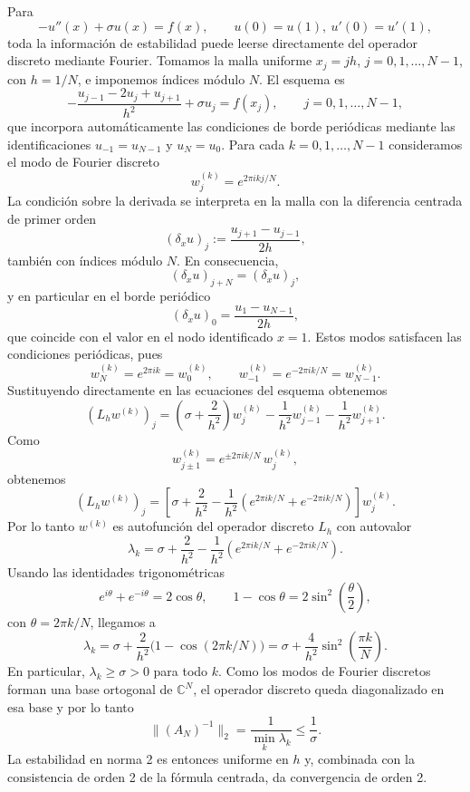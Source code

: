 \documentclass[a4paper,11pt]{report}
\begin{document}
Para
\[
-u''(x)+\sigma u(x)=f(x),\qquad u(0)=u(1),\ u'(0)=u'(1),
\]
toda la información de estabilidad puede leerse directamente del operador discreto mediante Fourier. Tomamos la malla uniforme $x_j=jh$, $j=0,1,\dots,N-1$, con $h=1/N$, e imponemos índices módulo $N$. El esquema es
\[
  -\frac{u_{j-1}-2u_j+u_{j+1}}{h^2}+\sigma u_j=f(x_j),
  \qquad j=0,1,\dots,N-1,
\]
que incorpora automáticamente las condiciones de borde periódicas mediante las identificaciones $u_{-1}=u_{N-1}$ y $u_N=u_0$. Para cada $k=0,1,\dots,N-1$ consideramos el modo de Fourier discreto
\[
  w_j^{(k)}=e^{2\pi i kj/N}.
\]
La condición sobre la derivada se interpreta en la malla con la diferencia centrada de primer orden
\[
  (\delta_x u)_j:=\frac{u_{j+1}-u_{j-1}}{2h},
\]
también con índices módulo $N$. En consecuencia,
\[
  (\delta_x u)_{j+N}=(\delta_x u)_j,
\]
y en particular en el borde periódico
\[
  (\delta_x u)_0=\frac{u_1-u_{N-1}}{2h},
\]
que coincide con el valor en el nodo identificado $x=1$.
Estos modos satisfacen las condiciones periódicas, pues
\[
  w_N^{(k)}=e^{2\pi i k}=w_0^{(k)},
  \qquad
  w_{-1}^{(k)}=e^{-2\pi i k/N}=w_{N-1}^{(k)}.
\]
Sustituyendo directamente en las ecuaciones del esquema obtenemos
\[
  (L_h w^{(k)})_j
  =\left(\sigma+\frac{2}{h^2}\right)w_j^{(k)}
   -\frac{1}{h^2}w_{j-1}^{(k)}
   -\frac{1}{h^2}w_{j+1}^{(k)}.
\]
Como
\[
  w_{j\pm1}^{(k)}=e^{\pm 2\pi i k/N}\,w_j^{(k)},
\]
obtenemos
\[
  (L_h w^{(k)})_j
  =\left[\sigma+\frac{2}{h^2}-\frac{1}{h^2}\left(e^{2\pi i k/N}+e^{-2\pi i k/N}\right)\right]w_j^{(k)}.
\]
Por lo tanto $w^{(k)}$ es autofunción del operador discreto $L_h$ con autovalor
\[
  \lambda_k=\sigma+\frac{2}{h^2}-\frac{1}{h^2}\left(e^{2\pi i k/N}+e^{-2\pi i k/N}\right).
\]
Usando las identidades trigonométricas
\[
  e^{i\theta}+e^{-i\theta}=2\cos\theta,
  \qquad
  1-\cos\theta=2\sin^2\!\left(\frac{\theta}{2}\right),
\]
con $\theta=2\pi k/N$, llegamos a
\[
  \lambda_k
  =\sigma+\frac{2}{h^2}\bigl(1-\cos(2\pi k/N)\bigr)
  =\sigma+\frac{4}{h^2}\sin^2\!\left(\frac{\pi k}{N}\right).
\]
En particular, $\lambda_k\ge\sigma>0$ para todo $k$. Como los modos de Fourier discretos forman una base ortogonal de $\mathbb C^N$, el operador discreto queda diagonalizado en esa base y por lo tanto
\[
  \|(A_N)^{-1}\|_2=\frac{1}{\min_k\lambda_k}\le\frac{1}{\sigma}.
\]
La estabilidad en norma 2 es entonces uniforme en $h$ y, combinada con la consistencia de orden 2 de la fórmula centrada, da convergencia de orden 2.
\end{document}
